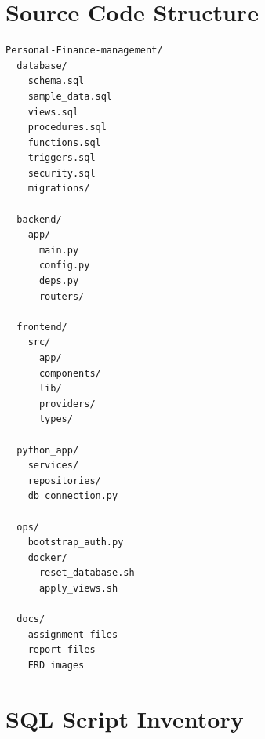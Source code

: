 \documentclass{article}
\begin{document}
\section{Source Code Structure}
\label{appendix:source-code-structure}
\begin{lstlisting}[style=codestyle, caption={Project source code structure}]
Personal-Finance-management/
  database/
    schema.sql
    sample_data.sql
    views.sql
    procedures.sql
    functions.sql
    triggers.sql
    security.sql
    migrations/

  backend/
    app/
      main.py
      config.py
      deps.py
      routers/

  frontend/
    src/
      app/
      components/
      lib/
      providers/
      types/

  python_app/
    services/
    repositories/
    db_connection.py

  ops/
    bootstrap_auth.py
    docker/
      reset_database.sh
      apply_views.sh

  docs/
    assignment files
    report files
    ERD images
\end{lstlisting}

\section{SQL Script Inventory}
\label{appendix:sql-script-inventory}
\small
\renewcommand{\arraystretch}{1.2}
\end{document}
